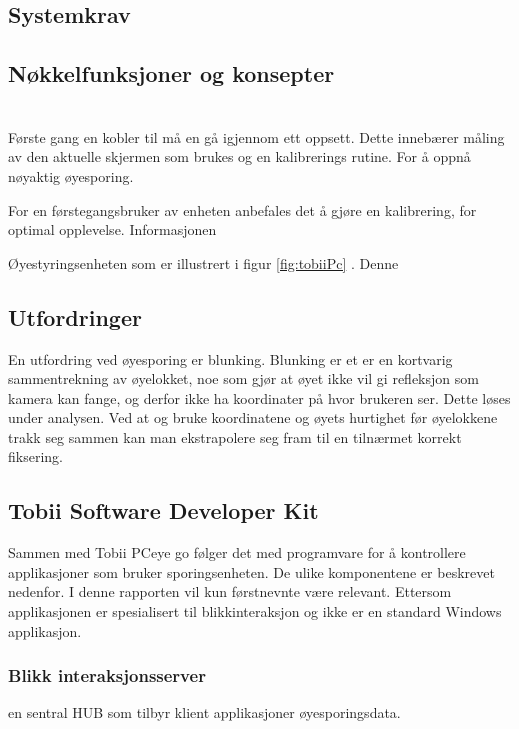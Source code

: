 \subsection{Systemkrav}

\subsection{Nøkkelfunksjoner og konsepter}

\section{}



Første gang en kobler til må en gå igjennom ett oppsett. Dette innebærer måling av den aktuelle skjermen som brukes og en kalibrerings rutine. For å oppnå nøyaktig øyesporing.  

For en førstegangsbruker av enheten anbefales det å gjøre en kalibrering, for optimal opplevelse. Informasjonen


Øyestyringsenheten som er illustrert i figur \ref{fig:tobiiPc}  . Denne



\subsection{Utfordringer}

En utfordring ved øyesporing er blunking. Blunking er et er en kortvarig sammentrekning av øyelokket, noe som gjør at øyet ikke vil gi refleksjon som kamera kan fange, og derfor ikke ha koordinater på hvor brukeren ser. Dette løses under analysen. Ved at og bruke koordinatene og øyets hurtighet før øyelokkene trakk seg sammen kan man ekstrapolere seg fram til en tilnærmet korrekt fiksering. 


\subsection{Tobii Software Developer Kit}
\label{subsec:blikk}

Sammen med Tobii PCeye go følger det med programvare for å kontrollere applikasjoner som bruker sporingsenheten. De ulike komponentene er beskrevet nedenfor. I denne rapporten vil kun førstnevnte være relevant. Ettersom applikasjonen er spesialisert til blikkinteraksjon og ikke er en standard Windows applikasjon.

\subsubsection{Blikk interaksjonsserver}
en sentral HUB som tilbyr klient applikasjoner øyesporingsdata. 

